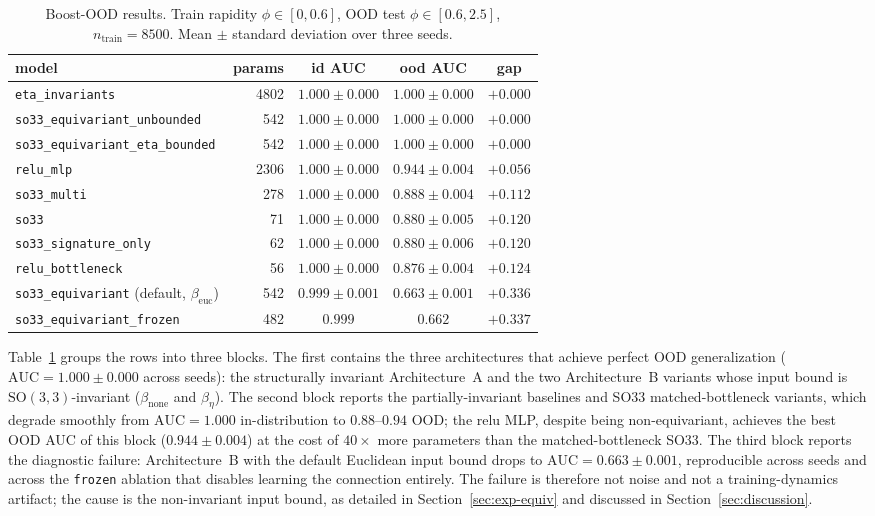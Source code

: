 \documentclass[11pt]{article}
\begin{document}
\begin{table}[t]
  \centering
  \caption{Boost-OOD results. Train rapidity $\phi \in [0, 0.6]$,
    OOD test $\phi \in [0.6, 2.5]$, $n_\text{train}=8500$. Mean
    $\pm$ standard deviation over three seeds.}
  \label{tab:boost-ood}
  \begin{tabular}{lrccc}
    \toprule
    model & params & id AUC & ood AUC & gap \\
    \midrule
    \texttt{eta\_invariants}                 & 4802 & $1.000\pm 0.000$ & $\mathbf{1.000\pm 0.000}$ & $+0.000$ \\
    \texttt{so33\_equivariant\_unbounded}    & 542  & $1.000\pm 0.000$ & $\mathbf{1.000\pm 0.000}$ & $+0.000$ \\
    \texttt{so33\_equivariant\_eta\_bounded} & 542  & $1.000\pm 0.000$ & $\mathbf{1.000\pm 0.000}$ & $+0.000$ \\
    \midrule
    \texttt{relu\_mlp}                       & 2306 & $1.000\pm 0.000$ & $0.944\pm 0.004$ & $+0.056$ \\
    \texttt{so33\_multi}                     & 278  & $1.000\pm 0.000$ & $0.888\pm 0.004$ & $+0.112$ \\
    \texttt{so33}                            & 71   & $1.000\pm 0.000$ & $0.880\pm 0.005$ & $+0.120$ \\
    \texttt{so33\_signature\_only}           & 62   & $1.000\pm 0.000$ & $0.880\pm 0.006$ & $+0.120$ \\
    \texttt{relu\_bottleneck}                & 56   & $1.000\pm 0.000$ & $0.876\pm 0.004$ & $+0.124$ \\
    \midrule
    \texttt{so33\_equivariant} (default, $\beta_{\text{euc}}$)
                                             & 542  & $0.999\pm 0.001$ & $0.663\pm 0.001$ & $+0.336$ \\
    \texttt{so33\_equivariant\_frozen}       & 482  & $0.999$          & $0.662$          & $+0.337$ \\
    \bottomrule
  \end{tabular}
\end{table}

Table~\ref{tab:boost-ood} groups the rows into three blocks. The first
contains the three architectures that achieve perfect OOD generalization
($\mathrm{AUC}=1.000\pm 0.000$ across seeds): the structurally invariant
Architecture~A and the two Architecture~B variants whose input bound is
$\mathrm{SO}(3,3)$-invariant ($\beta_{\text{none}}$ and $\beta_\eta$).
The second block reports the partially-invariant baselines and SO33
matched-bottleneck variants, which degrade smoothly from
$\mathrm{AUC}=1.000$ in-distribution to $0.88$--$0.94$ OOD; the relu MLP,
despite being non-equivariant, achieves the best OOD AUC of this block
($0.944\pm 0.004$) at the cost of $40\times$ more parameters than the
matched-bottleneck SO33. The third block reports the diagnostic
failure: Architecture~B with the default Euclidean input bound drops to
$\mathrm{AUC}=0.663\pm 0.001$, reproducible across seeds and across the
\texttt{frozen} ablation that disables learning the connection
entirely. The failure is therefore not noise and not a training-dynamics
artifact; the cause is the non-invariant input bound, as detailed in
Section~\ref{sec:exp-equiv} and discussed in
Section~\ref{sec:discussion}.
\end{document}
